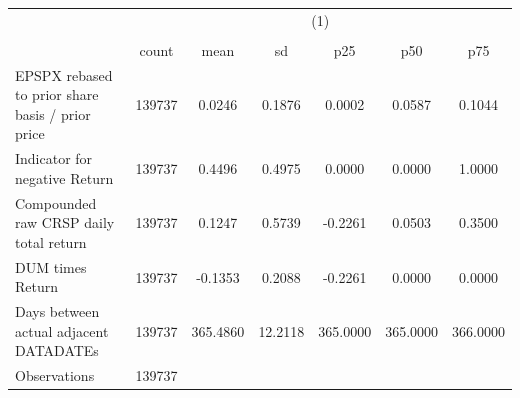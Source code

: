 {
\def\sym#1{\ifmmode^{#1}\else\(^{#1}\)\fi}
\begin{tabular}{l*{1}{cccccc}}
\hline\hline
                    &\multicolumn{6}{c}{(1)}                                                      \\
                    &\multicolumn{6}{c}{}                                                         \\
                    &       count&        mean&          sd&         p25&         p50&         p75\\
\hline
EPSPX rebased to prior share basis / prior price&      139737&      0.0246&      0.1876&      0.0002&      0.0587&      0.1044\\
Indicator for negative Return&      139737&      0.4496&      0.4975&      0.0000&      0.0000&      1.0000\\
Compounded raw CRSP daily total return&      139737&      0.1247&      0.5739&     -0.2261&      0.0503&      0.3500\\
DUM times Return    &      139737&     -0.1353&      0.2088&     -0.2261&      0.0000&      0.0000\\
Days between actual adjacent DATADATEs&      139737&    365.4860&     12.2118&    365.0000&    365.0000&    366.0000\\
\hline
Observations        &      139737&            &            &            &            &            \\
\hline\hline
\end{tabular}
}
